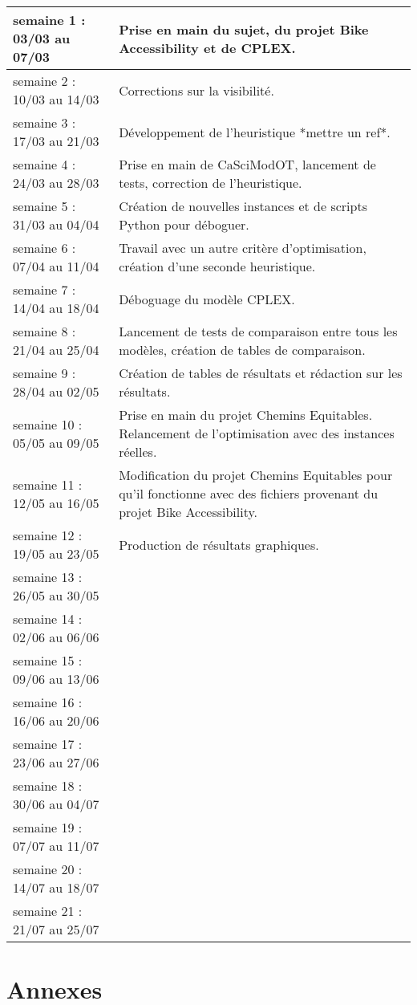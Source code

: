 \documentclass[a4paper,12pt,twoside,french]{article}
\begin{document}
\begin{longtable}[H]{| m{5cm} | m{10cm} |}
semaine 1 : 03/03 au 07/03 & Prise en main du sujet, du projet Bike Accessibility et de CPLEX. \\
\hline
semaine 2 : 10/03 au 14/03 & Corrections sur la visibilité.\\
\hline
semaine 3 : 17/03 au 21/03 & Développement de l'heuristique *mettre un ref*.\\
\hline
semaine 4 : 24/03 au 28/03 & Prise en main de CaSciModOT, lancement de tests, correction de l'heuristique.\\
\hline
semaine 5 : 31/03 au 04/04 & Création de nouvelles instances et de scripts Python pour déboguer.\\
\hline
semaine 6 : 07/04 au 11/04 & Travail avec un autre critère d'optimisation, création d'une seconde heuristique. \\
\hline
semaine 7 : 14/04 au 18/04 & Déboguage du modèle CPLEX.\\
\hline
semaine 8 : 21/04 au 25/04 & Lancement de tests de comparaison entre tous les modèles, création de tables de comparaison.\\
\hline
semaine 9 : 28/04 au 02/05 & Création de tables de résultats et rédaction sur les résultats. \\
\hline
semaine 10 : 05/05 au 09/05 & Prise en main du projet Chemins Equitables. Relancement de l'optimisation avec des instances réelles. \\
\hline
semaine 11 : 12/05 au 16/05 & Modification du projet Chemins Equitables pour qu'il fonctionne avec des fichiers provenant du projet Bike Accessibility. \\
\hline
semaine 12 : 19/05 au 23/05 & Production de résultats graphiques. \\
\hline
semaine 13 : 26/05 au 30/05 & \\
\hline
semaine 14 : 02/06 au 06/06 & \\
\hline
semaine 15 : 09/06 au 13/06 & \\
\hline
semaine 16 : 16/06 au 20/06 & \\
\hline
semaine 17 : 23/06 au 27/06 & \\
\hline
semaine 18 : 30/06 au 04/07 & \\
\hline
semaine 19 : 07/07 au 11/07 & \\
\hline
semaine 20 : 14/07 au 18/07 & \\
\hline
semaine 21 : 21/07 au 25/07 & \\
\end{longtable}


\newpage
\printbibliography[
heading=bibintoc,
title={Bibliographie}
]

\newpage
\section{Annexes}
\end{document}
